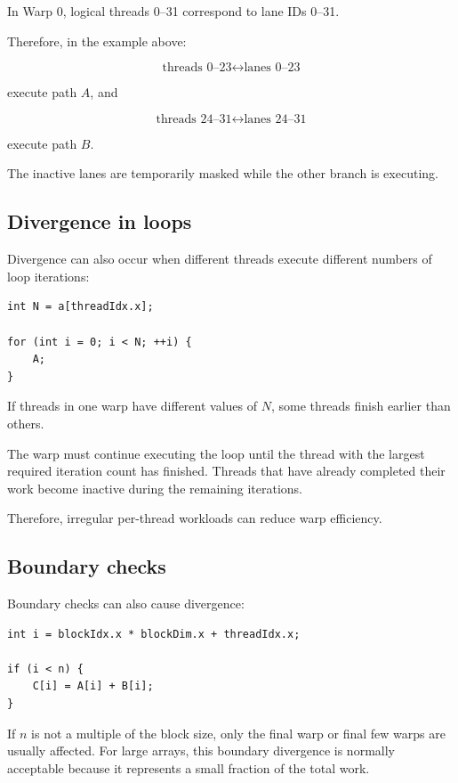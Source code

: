 \documentclass[11pt,a4paper]{article}
\begin{document}
In Warp 0, logical threads 0--31 correspond to lane IDs 0--31.

Therefore, in the example above:

\[
\text{threads 0--23}
\leftrightarrow
\text{lanes 0--23}
\]

execute path \(A\), and

\[
\text{threads 24--31}
\leftrightarrow
\text{lanes 24--31}
\]

execute path \(B\).

The inactive lanes are temporarily masked while the other branch is executing.

\subsection{Divergence in loops}

Divergence can also occur when different threads execute different numbers of loop iterations:

\begin{lstlisting}
int N = a[threadIdx.x];

for (int i = 0; i < N; ++i) {
    A;
}
\end{lstlisting}

If threads in one warp have different values of \(N\), some threads finish earlier than others.

The warp must continue executing the loop until the thread with the largest required iteration count has finished. Threads that have already completed their work become inactive during the remaining iterations.

Therefore, irregular per-thread workloads can reduce warp efficiency.

\subsection{Boundary checks}

Boundary checks can also cause divergence:

\begin{lstlisting}
int i = blockIdx.x * blockDim.x + threadIdx.x;

if (i < n) {
    C[i] = A[i] + B[i];
}
\end{lstlisting}

If \(n\) is not a multiple of the block size, only the final warp or final few warps are usually affected. For large arrays, this boundary divergence is normally acceptable because it represents a small fraction of the total work.
\end{document}
